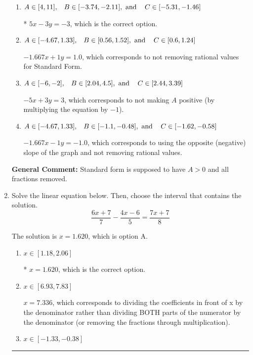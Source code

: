 \documentclass{extbook}[14pt]
\newcommand{\litem}[1]{\item #1

\rule{\textwidth}{0.4pt}}
\begin{document}
\begin{enumerate}
{\begin{enumerate}[label=\Alph*.]
 $5x + 3y = 3$, which corresponds to using the opposite (negative) slope of the graph, but did everything else correctly.
\item \( A \in [4, 11], \hspace{3mm} B \in [-3.74, -2.11], \text{ and } \hspace{3mm} C \in [-5.31, -1.46] \)

* $5x - 3y = -3$, which is the correct option.
\item \( A \in [-4.67, 1.33], \hspace{3mm} B \in [0.56, 1.52], \text{ and } \hspace{3mm} C \in [0.6, 1.24] \)

 $-1.667x + 1y = 1.0$, which corresponds to not removing rational values for Standard Form.
\item \( A \in [-6, -2], \hspace{3mm} B \in [2.04, 4.5], \text{ and } \hspace{3mm} C \in [2.44, 3.39] \)

 $-5x + 3y = 3$, which corresponds to not making $A$ positive (by multiplying the equation by $-1$).
\item \( A \in [-4.67, 1.33], \hspace{3mm} B \in [-1.1, -0.48], \text{ and } \hspace{3mm} C \in [-1.62, -0.58] \)

 $-1.667x - 1y = -1.0$, which corresponds to using the opposite (negative) slope of the graph and not removing rational values.
\end{enumerate}

\textbf{General Comment:} Standard form is supposed to have $A > 0$ and all fractions removed.
}
\litem{
Solve the linear equation below. Then, choose the interval that contains the solution.
\[ \frac{6x + 7}{7} - \frac{4x -6}{5} = \frac{7x + 7}{8} \]

The solution is \( x = 1.620 \), which is option A.\begin{enumerate}[label=\Alph*.]
\item \( x \in [1.18, 2.06] \)

* $x = 1.620$, which is the correct option.
\item \( x \in [6.93, 7.83] \)

 $x = 7.336$, which corresponds to dividing the coefficients in front of x by the denominator rather than dividing BOTH parts of the numerator by the denominator (or removing the fractions through multiplication).
\item \( x \in [-1.33, -0.38] \)


\end{enumerate}}
\end{enumerate}
\end{document}
